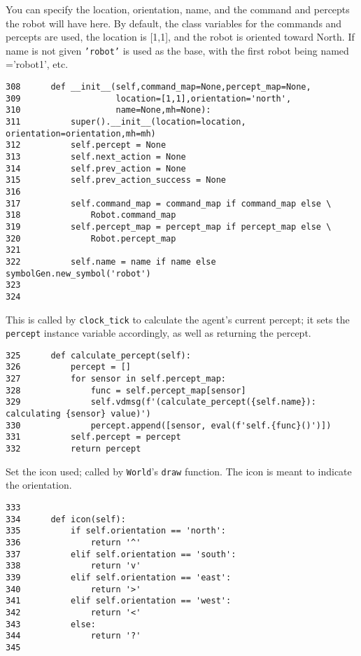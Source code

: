 \documentclass[11pt]{tufte-handout}
\begin{document}
You can specify the location, orientation, name, and the command and percepts the robot will have here.  By default, the class variables for the commands and percepts are used, the location is [1,1], and the robot is oriented toward North.  If name is not given \texttt{'robot'} is used as the base, with the first robot being named ='robot1', etc.

\begin{verbatim}
308      def __init__(self,command_map=None,percept_map=None,
309                   location=[1,1],orientation='north',
310                   name=None,mh=None):
311          super().__init__(location=location, orientation=orientation,mh=mh)
312          self.percept = None
313          self.next_action = None
314          self.prev_action = None
315          self.prev_action_success = None
316          
317          self.command_map = command_map if command_map else \
318              Robot.command_map
319          self.percept_map = percept_map if percept_map else \
320              Robot.percept_map
321  
322          self.name = name if name else symbolGen.new_symbol('robot')
323  
324  
\end{verbatim}

This is called by \texttt{clock\_tick} to calculate the agent's current percept; it sets the \texttt{percept} instance variable accordingly, as well as returning the percept.

\begin{verbatim}
325      def calculate_percept(self):
326          percept = []
327          for sensor in self.percept_map:
328              func = self.percept_map[sensor]
329              self.vdmsg(f'(calculate_percept({self.name}): calculating {sensor} value)')
330              percept.append([sensor, eval(f'self.{func}()')])
331          self.percept = percept
332          return percept
\end{verbatim}

Set the icon used; called by \texttt{World}'s \texttt{draw} function.  The icon is meant to indicate the orientation.

\begin{verbatim}
333  
334      def icon(self):
335          if self.orientation == 'north':
336              return '^'
337          elif self.orientation == 'south':
338              return 'v'
339          elif self.orientation == 'east':
340              return '>'
341          elif self.orientation == 'west':
342              return '<'
343          else:
344              return '?'
345          
\end{verbatim}
\end{document}
